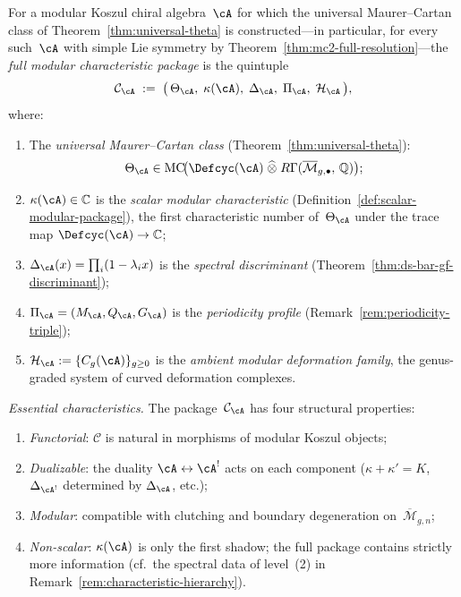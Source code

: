 \begin{definition}
\label{def:full-modular-package}
For a modular Koszul chiral algebra~$\cA$ for which the universal
Maurer--Cartan class of Theorem~\ref{thm:universal-theta} is
constructed---in particular, for every such~$\cA$ with simple Lie
symmetry by Theorem~\ref{thm:mc2-full-resolution}---the
\emph{full modular characteristic package} is the quintuple
\begin{equation}\label{eq:full-package-quintuple}
\mathcal{C}_{\cA}
\;:=\;
\bigl(\,\Theta_{\cA},\;\kappa(\cA),\;\Delta_{\cA},\;
       \Pi_{\cA},\;\mathcal{H}_{\cA}\,\bigr),
\end{equation}
where:
\begin{enumerate}[label=\textup{(\roman*)}]
\item The \emph{universal Maurer--Cartan class}
  (Theorem~\ref{thm:universal-theta}):
  \[
  \Theta_{\cA} \in
  \operatorname{MC}\!\bigl(
    \Defcyc(\cA) \;\widehat{\otimes}\;
    R\Gamma(\overline{\mathcal{M}}_{g,\bullet},\, \mathbb{Q})
  \bigr);
  \]
\item $\kappa(\cA) \in \mathbb{C}$ is the
  \emph{scalar modular characteristic}
  (Definition~\ref{def:scalar-modular-package}),
  the first characteristic number of~$\Theta_{\cA}$
  under the trace map
  $\Defcyc(\cA) \to \mathbb{C}$;
\item $\Delta_{\cA}(x) = \prod_{i}(1 - \lambda_i x)$ is the
  \emph{spectral discriminant}
  (Theorem~\ref{thm:ds-bar-gf-discriminant});
\item $\Pi_{\cA} = (M_{\cA}, Q_{\cA}, G_{\cA})$ is the
  \emph{periodicity profile}
  (Remark~\ref{rem:periodicity-triple});
\item $\mathcal{H}_{\cA} := \{C_g(\cA)\}_{g \geq 0}$ is the
  \emph{ambient modular deformation family}, the genus-graded
  system of curved deformation complexes.
\end{enumerate}

\smallskip\noindent
\emph{Essential characteristics.}
The package~$\mathcal{C}_{\cA}$ has four structural properties:
\begin{enumerate}[label=\textup{(\alph*)}]
\item \emph{Functorial}: $\mathcal{C}$ is natural in morphisms
  of modular Koszul objects;
\item \emph{Dualizable}: the duality $\cA \leftrightarrow \cA^!$
  acts on each component
  ($\kappa + \kappa' = K$, $\Delta_{\cA^!}$ determined by
  $\Delta_{\cA}$, etc.);
\item \emph{Modular}: compatible with clutching and
  boundary degeneration on~$\overline{\mathcal{M}}_{g,n}$;
\item \emph{Non-scalar}: $\kappa(\cA)$ is only the first shadow;
  the full package contains strictly more information
  (cf.\ the spectral data of level~(2) in
  Remark~\ref{rem:characteristic-hierarchy}).
\end{enumerate}


\end{definition}
